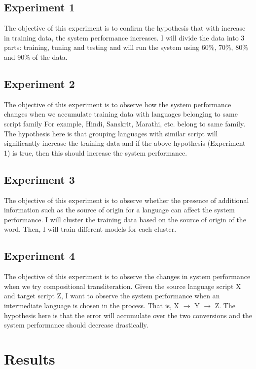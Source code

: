 \documentclass[11pt,a4paper]{article}
\begin{document}
\subsection{Experiment 1}
The objective of this experiment is to confirm the hypothesis that with increase in training data, the system performance increases. I will divide the data into 3 parts: training, tuning and testing and will run the system using 60\%, 70\%, 80\% and 90\% of the data.

\subsection{Experiment 2}
The objective of this experiment is to observe how the system performance changes when we accumulate training data with languages belonging to same script family For example, Hindi, Sanskrit, Marathi, etc. belong to same family. The hypothesis here is that grouping languages with similar script will significantly increase the training data and if the above hypothesis (Experiment 1) is true, then this should increase the system performance.

\subsection{Experiment 3}
The objective of this experiment is to observe whether the presence of additional information such as the source of origin for a language can affect the system performance. I will cluster the training data based on the source of origin of the word. Then, I will train different models for each cluster.

\subsection{Experiment 4}
The objective of this experiment is to observe the changes in system performance when we try compositional transliteration. Given the source language script X and target script Z, I want to observe the system performance when an intermediate language is chosen in the process. That is, X $\to$ Y $\to$ Z. The hypothesis here is that the error will accumulate over the two conversions and the system performance should decrease drastically.

\section{Results}
\end{document}
